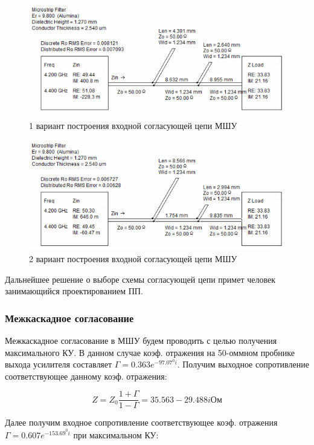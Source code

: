 \documentclass[utf8x, 14pt, oneside, a4paper]{article}
\begin{document}
				\begin{figure}[H]
					\centering
					\includegraphics[width=0.7\linewidth]{"Рисунки/Схемы/Согласование с антенной А"}
					\caption{1 вариант построения входной согласующей цепи МШУ}
					\label{fig:match0a}
				\end{figure}
				
				\begin{figure}[H]
					\centering
					\includegraphics[width=0.7\linewidth]{"Рисунки/Схемы/Согласование с антенной Б"}
					\caption{2 вариант построения входной согласующей цепи МШУ}
					\label{fig:match0b}
				\end{figure}
			
				 Дальнейшее решение о выборе схемы согласующей цепи примет человек занимающийся проектированием ПП.
				
			\subsubsection{Межкаскадное согласование}
				Межкаскадное согласование в МШУ будем проводить с целью получения максимального КУ. В данном случае коэф. отражения на 50-оммном пробнике выхода усилителя составляет $\Gamma=0.363e^{-97.07^{0}i}$. Получим выходное сопротивление соответствующее данному коэф. отражения:
			
				\begin{equation}
					\label{eq:Gam_amp1}
					Z=Z_{0}\frac{1+\Gamma}{1-\Gamma}=35.563-29.488i \text{Ом}
				\end{equation}
			
				Далее получим входное сопротивление соответствующее коэф. отражения $\Gamma=0.607e^{-153.69^{0}i}$ при максимальном КУ:
				
\end{document}
